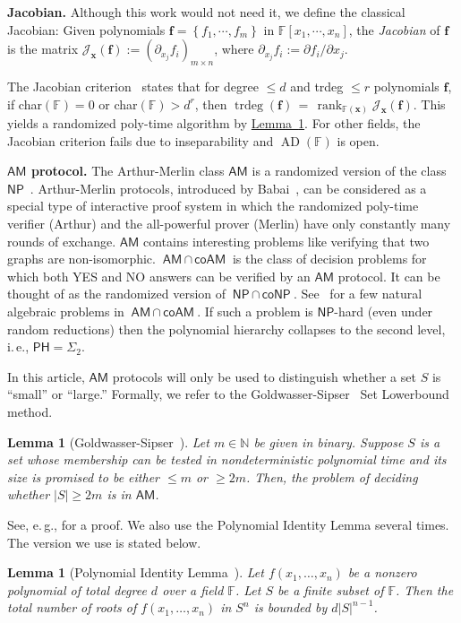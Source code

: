 \documentclass[11pt]{article}
\numberwithin{equation}{section}
\newtheorem{lemma}[theorem]{Lemma}
\theoremstyle{definition}
\theoremstyle{plain}
\newcommand{\N}{\mathbb N}
\newcommand{\cclass}[1]{\textsf{#1}}
\newcommand{\ie}{i.\,e.}
\newcommand{\eg}{e.\,g.}
\newcommand{\expref}[2]{\hyperref[#2]{#1~\ref{#2}}}
\newcommand{\F}{\mathbb{F}}
\DeclareMathOperator{\rk}{\mathrm{rank}}
\DeclareMathOperator{\trdeg}{\mathrm{trdeg}}
\newcommand{\pder}[2]{\partial_{#2}#1}
\newcommand{\inbrace }[1]{\left\{#1\right\}}
\newcommand{\NP}{\cclass{NP}\xspace}  %
\newcommand{\coNP}{\cclass{coNP}\xspace}  %
\newcommand{\NPcapcoNP}{\NP\,\cap\,\coNP}  %
\newcommand{\AM}{\cclass{AM}\xspace}  %
\newcommand{\coAM}{\cclass{coAM}\xspace}  %
\newcommand{\AMcapcoAM}{\AM\,\cap\,\coAM}  %
\newcommand{\PH}{\cclass{PH}\xspace}  %
\DeclareMathOperator{\AD}{\mathrm{AD}\xspace} %
\begin{document}
\textbf{Jacobian.}
Although this work would not need it, we define the classical Jacobian: 
%
Given polynomials $\mathbf{f} = \inbrace{f_1, \cdots, f_m}$ in $\F[x_1,\cdots, x_n]$, the \emph{Jacobian} of $\mathbf{f}$ %
is the matrix $\mathcal{J}_{\mathbf{x}}(\mathbf{f}) := (\pder{f_i}{x_j})_{m \times n}$, where $\pder{f_i}{x_j} := \partial f_i/ \partial x_j$. 

The Jacobian criterion~\cite{Jac41, BMS13}
%
states that for  %
degree $\le d$ and trdeg $\le r$ polynomials $\mathbf{f}$, if char$(\F) = 0$ or char$(\F) > d^r$, 
then $\trdeg(\mathbf{f}) \,=\, \rk_{\F(\mathbf{x})} \mathcal{J}_{\mathbf{x}}(\mathbf{f})$. This yields a randomized poly-time algorithm 
%
by \expref{Lemma}{Polynomial Identity}. %
For other fields, the Jacobian criterion fails due to inseparability and
%
$\AD(\F)$    %
is open.

\smallskip\noindent
\textbf{$\AM$ protocol.}
The %
Arthur-Merlin class $\AM$ is a randomized version of the class
$\NP$~\cite{AB09}.
Arthur-Merlin protocols, introduced by Babai~\cite{babai1985trading}, can be considered as a special type of interactive proof system in which the randomized poly-time verifier (Arthur) and the all-powerful prover (Merlin) have only constantly many rounds of exchange. 
$\AM$ contains interesting problems like
%
verifying that   %
two graphs are non-isomorphic.
%
$\AMcapcoAM$   %
is the class of decision problems for which both YES and NO answers can be verified by an $\AM$ protocol. It can be thought of as the randomized version of
%
$\NPcapcoNP$.    %
See~\cite{kayal2006complexity} for a few natural algebraic problems in
%
$\AMcapcoAM$.
If such a problem is $\NP$-hard (even under random reductions) then
the %
polynomial hierarchy collapses to the
%
second level,   %
\ie, 
%
$\PH=\Sigma_2$. %

In this
%
article, $\AM$ protocols  %
will only be used to distinguish whether a set $S$ is ``small'' 
or ``large.'' Formally, we refer to the Goldwasser-Sipser~\cite{goldwasser1986private} Set Lowerbound 
%
method. %
\begin{lemma}[Goldwasser-Sipser~\cite{goldwasser1986private}] \label{lem_amprotocol}
Let $m\in\N$ be given in binary. Suppose $S$ is a set whose membership can be tested in nondeterministic polynomial time and its size is promised to be either $\le m$ or $\ge 2m$. Then, the problem of deciding whether 
%
$|S| \ge 2m$ %
is in $\AM$.
\end{lemma}
 See, \eg, \cite[Chapter~8]{AB09} for a proof.
We also use the
%
Polynomial Identity Lemma  %
several times.
 The version we use is stated below.
 \begin{lemma}[{Polynomial Identity Lemma~\cite{Sch80,zippel1979probabilistic,demillo1978probabilistic}}] \label{Polynomial Identity}
Let $f(x_1,\ldots,x_n)$ be a nonzero polynomial of total degree $d$ over a field $\F$. Let $S$ be a finite subset of $\F$. Then the total number of roots of $f(x_1,\ldots,x_n)$ in $S^n$ is bounded by $d|S|^{n-1}$.  
\end{lemma}
\end{document}
